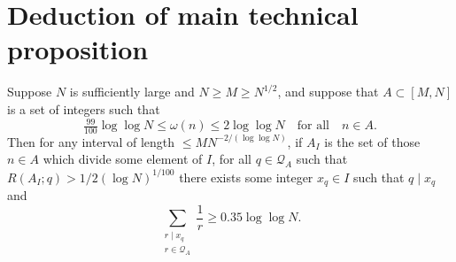 \chapter{Deduction of main technical proposition}
\label{chap:techprop}

\begin{lemma}\label{lem:find_multiples}
\leanok
{}
Suppose $N$ is sufficiently large and $N\geq M\geq N^{1/2}$, and suppose that $A\subset [M,N]$ is a set of integers such that
\[\tfrac{99}{100}\log\log N\leq \omega(n)\leq  2\log\log N\quad\textrm{for all}\quad n\in A.\]
Then for any interval of length $\leq MN^{-2/(\log \log N)}$, if $A_I$ is the set of those $n\in A$ which divide some element of $I$, for all $q\in\mathcal{Q}_A$ such that $R(A_I;q)> 1/2(\log N)^{1/100}$ there exists some integer $x_q\in I$ such that $q\mid x_q$ and
\[\sum_{\substack{r\mid x_q\\ r\in \mathcal{Q}_A}}\frac{1}{r}\geq 0.35\log\log N.\]
\end{lemma}
